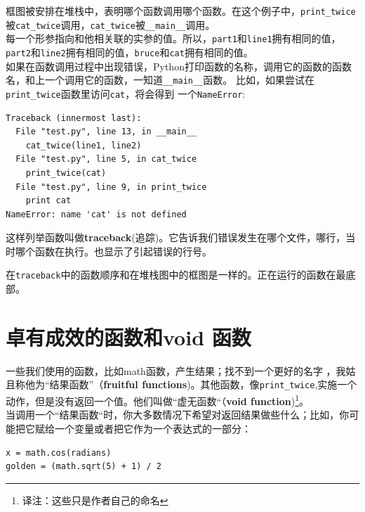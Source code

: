 框图被安排在堆栈中，表明哪个函数调用哪个函数。在这个例子中，\verb"print_twice"被\verb"cat_twice"调用，\verb"cat_twice"被\verb"__main__"调用。 \\

每一个形参指向和他相关联的实参的值。所以，{\tt part1}和{\tt line1}拥有相同的值，{\tt part2}和{\tt line2}拥有相同的值，{\tt bruce}和{\tt cat}拥有相同的值。\\

如果在函数调用过程中出现错误，Python打印函数的名称，调用它的函数的函数名，和上一个调用它的函数，一知道\verb"__main__"函数。
比如，如果尝试在\verb"print_twice"函数里访问{\tt cat}，将会得到
一个{\tt NameError}:

\beforeverb
\begin{verbatim}
Traceback (innermost last):
  File "test.py", line 13, in __main__
    cat_twice(line1, line2)
  File "test.py", line 5, in cat_twice
    print_twice(cat)
  File "test.py", line 9, in print_twice
    print cat
NameError: name 'cat' is not defined
\end{verbatim}
\afterverb

这样列举函数叫做{\bf traceback}(追踪)。它告诉我们错误发生在哪个文件，哪行，当时哪个函数在执行。也显示了引起错误的行号。


在{\tt traceback}中的函数顺序和在堆栈图中的框图是一样的。正在运行的函数在最底部。

\section{卓有成效的函数和void 函数}


一些我们使用的函数，比如math函数，产生结果；找不到一个更好的名字
，我姑且称他为“结果函数”（{\bf fruitful functions})。其他函数，像\verb"print_twice",实施一个动作，但是没有返回一个值。他们叫做“虚无函数“（{\bf void function})\footnote{译注：这些只是作者自己的命名}。  \\

当调用一个“结果函数“时，你大多数情况下希望对返回结果做些什么；比如，你可能把它赋给一个变量或者把它作为一个表达式的一部分：

\beforeverb
\begin{verbatim}
x = math.cos(radians)
golden = (math.sqrt(5) + 1) / 2
\end{verbatim}
\afterverb

